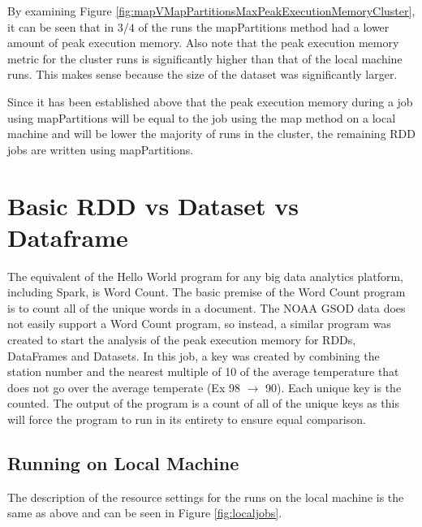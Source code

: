 \documentclass[conference]{IEEEtran}
\begin{document}
By examining Figure \ref{fig:mapVMapPartitionsMaxPeakExecutionMemoryCluster}, it can be seen that in $3/4$ of the runs the mapPartitions method had a lower amount of peak execution memory.
Also note that the peak execution memory metric for the cluster runs is significantly higher than that of the local machine runs.
This makes sense because the size of the dataset was significantly larger.

Since it has been established above that the peak execution memory during a job using mapPartitions will be equal to the job using the map method on a local machine and will be lower the majority of runs in the cluster, the remaining RDD jobs are written using mapPartitions.


\section{Basic RDD vs Dataset vs Dataframe}\label{basicjobs}
The equivalent of the Hello World program for any big data analytics platform, including Spark, is Word Count.
The basic premise of the Word Count program is to count all of the unique words in a document.
The NOAA GSOD data does not easily support a Word Count program, so instead, a similar program was created to start the analysis of the peak execution memory for RDDs, DataFrames and Datasets.
In this job, a key was created by combining the station number and the nearest multiple of 10 of the average temperature that does not go over the average temperate (Ex 98 $\rightarrow$ 90).
Each unique key is the counted.
The output of the program is a count of all of the unique keys as this will force the program to run in its entirety to ensure equal comparison.

\subsection{Running on Local Machine}

The description of the resource settings for the runs on the local machine is the same as above and can be seen in Figure \ref{fig:localjobs}.
\end{document}
